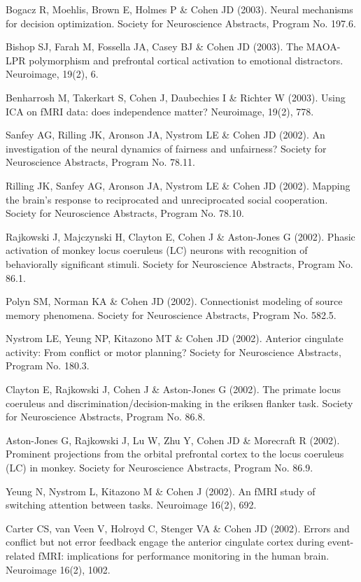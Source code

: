 \documentclass[10 pt]{article}
\begin{document}
Bogacz R, Moehlis, Brown E, Holmes P \& Cohen JD (2003). Neural mechanisms for decision optimization. Society for Neuroscience Abstracts, Program No. 197.6.

Bishop SJ, Farah M, Fossella JA, Casey BJ \& Cohen JD (2003). The MAOA-LPR polymorphism and prefrontal cortical activation to emotional distractors. Neuroimage, 19(2), 6.

Benharrosh M, Takerkart S, Cohen J, Daubechies I \& Richter W (2003). Using ICA on fMRI data: does independence matter? Neuroimage, 19(2), 778.

Sanfey AG, Rilling JK, Aronson JA, Nystrom LE \& Cohen JD (2002). An investigation of the neural dynamics of fairness and unfairness? Society for Neuroscience Abstracts, Program No. 78.11.

Rilling JK, Sanfey AG, Aronson JA, Nystrom LE \& Cohen JD (2002). Mapping the brain's response to reciprocated and unreciprocated social cooperation. Society for Neuroscience Abstracts, Program No. 78.10.

Rajkowski J, Majczynski H, Clayton E, Cohen J \& Aston-Jones G (2002). Phasic activation of monkey locus coeruleus (LC) neurons with recognition of behaviorally significant stimuli. Society for Neuroscience Abstracts, Program No. 86.1.

Polyn SM, Norman KA \& Cohen JD (2002). Connectionist modeling of source memory phenomena. Society for Neuroscience Abstracts, Program No. 582.5.

Nystrom LE, Yeung NP, Kitazono MT \& Cohen JD (2002). Anterior cingulate activity: From conflict or motor planning? Society for Neuroscience Abstracts, Program No. 180.3.

Clayton E, Rajkowski J, Cohen J \& Aston-Jones G (2002). The primate locus coeruleus and discrimination/decision-making in the eriksen flanker task. Society for Neuroscience Abstracts, Program No. 86.8.

Aston-Jones G, Rajkowski J, Lu W, Zhu Y, Cohen JD \& Morecraft R (2002). Prominent projections from the orbital prefrontal cortex to the locus coeruleus (LC) in monkey. Society for Neuroscience Abstracts, Program No. 86.9.

Yeung N, Nystrom L, Kitazono M \& Cohen J (2002). An fMRI study of switching attention between tasks. Neuroimage 16(2), 692.

Carter CS, van Veen V, Holroyd C, Stenger VA \& Cohen JD (2002). Errors and conflict but not error feedback engage the anterior cingulate cortex during event-related fMRI: implications for performance monitoring in the human brain. Neuroimage 16(2), 1002.
\end{document}
